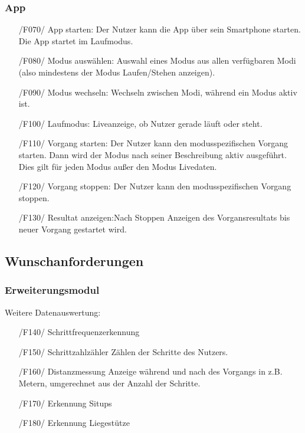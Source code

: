 \documentclass[a4paper,12pt]{article}
\begin{document}
    \subsubsection{App}
      \begin{itemize}
      \item[/F070/] \textsf{App starten:} Der Nutzer kann die App über sein Smartphone starten. Die App startet im Laufmodus.%
      \item[/F080/] \textsf{Modus auswählen:} Auswahl eines Modus aus allen verfügbaren Modi (also mindestens der Modus \glqq Laufen/Stehen anzeigen\grqq). 
      \item[/F090/] \textsf{Modus wechseln:} Wechseln zwischen Modi, während ein Modus aktiv ist. %
      \item[/F100/] \textsf{Laufmodus:} Liveanzeige, ob Nutzer gerade \glqq läuft\grqq{} oder \glqq steht\grqq{}.
      \item[/F110/] \textsf{Vorgang starten:} Der Nutzer kann den modusspezifischen Vorgang starten. Dann wird der Modus nach seiner Beschreibung aktiv ausgeführt. Dies gilt für jeden Modus außer den Modus \glqq Livedaten\grqq.
      \item[/F120/] \textsf{Vorgang stoppen:} Der Nutzer kann den modusspezifischen Vorgang stoppen.
      \item[/F130/] \textsf{Resultat anzeigen:}Nach Stoppen Anzeigen des Vorgansresultats bis neuer Vorgang gestartet wird.
    \end{itemize}
  \subsection{Wunschanforderungen}
    \subsubsection{Erweiterungsmodul}
      Weitere Datenauswertung:
      \begin{itemize}
      \item[/F140/] \textsf{Schrittfrequenzerkennung}%
      \item[/F150/] \textsf{Schrittzahlzähler} Zählen der Schritte des Nutzers. %
      \item[/F160/] \textsf{Distanzmessung} Anzeige während und nach des Vorgangs in z.B. Metern, umgerechnet aus der Anzahl der Schritte.
      \item[/F170/] \textsf{Erkennung Situps}
      \item[/F180/] \textsf{Erkennung Liegestütze}
      \end{itemize} 
\end{document}
